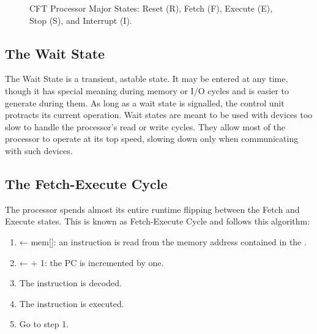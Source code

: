 \begin{figure}
  \centering
  \caption[CFT Processor Major States]{\label{hard:proc:major-states}CFT Processor Major States:
    Reset (R), Fetch (F), Execute (E), Stop (S), and Interrupt (I).}
\end{figure}

\subsection{The Wait State}

The Wait State is a transient, astable state. It may be entered at any time,
though it has special meaning during memory or I/O cycles and is easier to
generate during them. As long as a wait state is signalled, the control unit
protracts its current operation. Wait states are meant to be used with devices
too slow to handle the processor's read or write cycles. They allow most of the
processor to operate at its top speed, slowing down only when communicating
with such devices.





\subsection{The Fetch-Execute Cycle}
\label{sec:processor-cycle}

The processor spends almost its entire runtime flipping between the
Fetch and Execute states. This is known as Fetch-Execute Cycle and
follows this algorithm:

\begin{enumerate}
\item \IR{} ← mem[\PC]: an instruction is read from the memory address contained in the \PC.
\item \PC{} ← \PC{} + 1: the PC is incremented by one.
\item The instruction is decoded.
\item The instruction is executed.
\item Go to step 1.
\end{enumerate}

